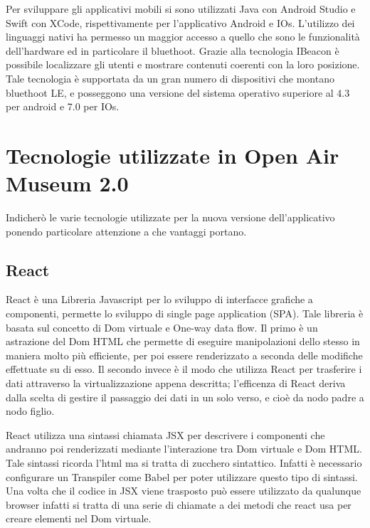 	Per sviluppare gli applicativi mobili si sono utilizzati Java con Android Studio e Swift con XCode, rispettivamente per l'applicativo Android e IOs. L'utilizzo dei linguaggi nativi ha permesso un maggior accesso a quello che sono le funzionalità dell'hardware ed in particolare il bluethoot. Grazie alla tecnologia IBeacon è possibile localizzare gli utenti e mostrare contenuti coerenti con la loro posizione. Tale tecnologia è supportata da un gran numero di dispositivi che montano bluethoot LE, e posseggono una versione del sistema operativo superiore al 4.3 per android e 7.0 per IOs.
	
\section{Tecnologie utilizzate in Open Air Museum 2.0}\vspace{5mm}
Indicherò le varie tecnologie utilizzate per la nuova versione dell'applicativo ponendo particolare attenzione a che vantaggi portano.\vspace{5mm}

	\subsection{React}\vspace{5mm}

React\cite{React} è una Libreria Javascript per lo sviluppo di interfacce grafiche a componenti, permette lo sviluppo di single page application (SPA). Tale libreria è basata sul concetto di Dom virtuale e One-way data flow. Il primo è un astrazione del Dom HTML che permette di eseguire manipolazioni dello stesso in maniera molto più efficiente, per poi essere renderizzato a seconda delle modifiche effettuate su di esso. Il secondo invece è il modo che utilizza React per trasferire i dati attraverso la virtualizzazione appena descritta; l'efficenza di React deriva dalla scelta di gestire il passaggio dei dati in un solo verso, e cioè da nodo padre a nodo figlio.\vspace{5mm}

React utilizza una sintassi chiamata JSX per descrivere i componenti che andranno poi renderizzati mediante l'interazione tra Dom virtuale e Dom HTML. Tale sintassi ricorda l'html ma si tratta di zucchero sintattico. Infatti è necessario configurare un Transpiler come Babel per poter utilizzare questo tipo di sintassi. Una volta che il codice in JSX viene trasposto può essere utilizzato da qualunque browser infatti si tratta di una serie di chiamate a dei metodi che react usa per creare elementi nel Dom virtuale.

